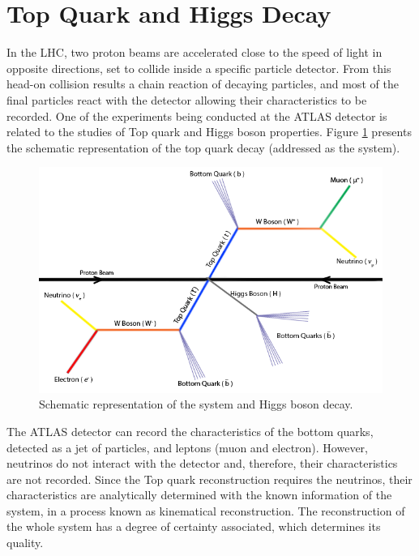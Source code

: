 \section{Top Quark and Higgs Decay}
\label{problem_and_app}

In the LHC, two proton beams are accelerated close to the speed of light in opposite directions, set to collide inside a specific particle detector. From this head-on collision results a chain reaction of decaying particles, and most of the final particles react with the detector allowing their characteristics to be recorded. One of the experiments being conducted at the ATLAS detector is related to the studies of Top quark and Higgs boson properties. Figure \ref{fig:ttbar} presents the schematic representation of the top quark decay (addressed as the \ttbar system).

\begin{figure}[!htp]
	\begin{center}
		\includegraphics[scale=0.4]{images/ttbar_higgs.png}
		\caption{Schematic representation of the \ttbar system and Higgs boson decay.}
		\label{fig:ttbar}
	\end{center}
\end{figure}

The ATLAS detector can record the characteristics of the bottom quarks, detected as a jet of particles, and leptons (muon and electron). However, neutrinos do not interact with the detector and, therefore, their characteristics are not recorded. Since the Top quark reconstruction requires the neutrinos, their characteristics are analytically determined with the known information of the system, in a process known as kinematical reconstruction. The reconstruction of the whole \ttbar system has a degree of certainty associated, which determines its quality.

